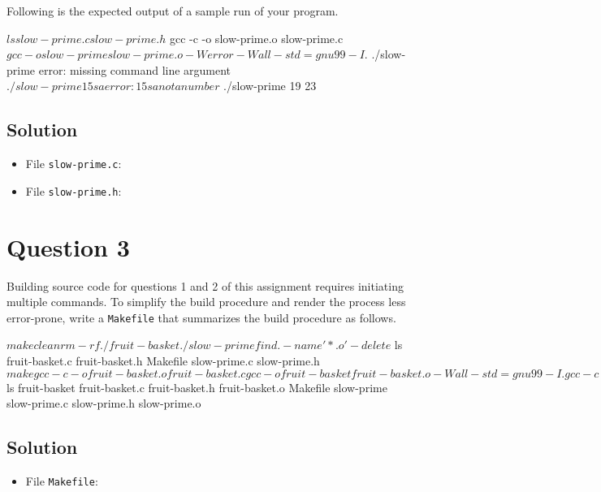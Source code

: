 \documentclass[12pt,letterpaper,twoside]{article}
\begin{document}
\lstset{language=c,tabsize=4}


Following is the expected output of a sample run of your program.

\begin{terminal}
$ ls
slow-prime.c slow-prime.h
$ gcc -c -o slow-prime.o slow-prime.c
$ gcc -o slow-prime slow-prime.o -Werror -Wall -std=gnu99 -I.
$ ./slow-prime
error: missing command line argument
$ ./slow-prime 15sa
error: 15sa not a number
$ ./slow-prime 19
23
\end{terminal}

\subsection*{Solution}

\lstset{language=c,tabsize=4}
\begin{itemize}
\item[] File \texttt{slow-prime.c}:

\newpage
\item[] File \texttt{slow-prime.h}:

\end{itemize}

\section*{Question 3}

Building source code for questions 1 and 2 of this assignment requires initiating multiple commands.
To simplify the build procedure and render the process less error-prone, write a \texttt{Makefile} that summarizes the build procedure as follows.

\begin{terminal}
$ make clean
rm -rf ./fruit-basket ./slow-prime
find . -name '*.o' -delete
$ ls
fruit-basket.c fruit-basket.h Makefile slow-prime.c
slow-prime.h
$ make
gcc -c -o fruit-basket.o fruit-basket.c
gcc -o fruit-basket fruit-basket.o -Wall -std=gnu99 -I.
gcc -c -o slow-prime.o slow-prime.c
gcc -o slow-prime slow-prime.o -Werror -Wall -std=gnu99 -I.
$ ls
fruit-basket fruit-basket.c fruit-basket.h fruit-basket.o
Makefile     slow-prime     slow-prime.c   slow-prime.h
slow-prime.o
\end{terminal}

\newpage

\subsection*{Solution}

\lstset{language=[gnu]make,tabsize=4}
\begin{itemize}
\item[] File \texttt{Makefile}:

\end{itemize}

\newpage
\end{document}
